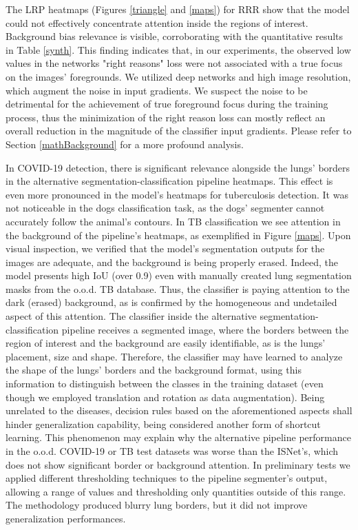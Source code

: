 \documentclass[fleqn,10pt]{wlscirep}
\begin{document}
{The LRP heatmaps (Figures \ref{triangle} and \ref{maps}) for RRR show that the model could not effectively concentrate attention inside the regions of interest. Background bias relevance is visible, corroborating with the quantitative results in Table \ref{synth}. This finding indicates that, in our experiments, the observed low values in the networks "right reasons" loss\cite{RRR} were not associated with a true focus on the images' foregrounds. We utilized deep networks and high image resolution, which augment the noise in input gradients. We suspect the noise to be detrimental for the achievement of true foreground focus during the training process, thus the minimization of the right reason loss can mostly reflect an overall reduction in the magnitude of the classifier input gradients. Please refer to Section \ref{mathBackground} for a more profound analysis.

In COVID-19 detection, there is significant relevance alongside the lungs' borders in the alternative segmentation-classification pipeline heatmaps. This effect is even more pronounced in the model's heatmaps for tuberculosis detection. It was not noticeable in the dogs classification task, as the dogs' segmenter cannot accurately follow the animal's contours. In TB classification we see attention in the background of the pipeline's heatmaps, as exemplified in Figure \ref{maps}. Upon visual inspection, we verified that the model's segmentation outputs for the images are adequate, and the background is being properly erased. Indeed, the model presents high IoU (over 0.9) even with manually created lung segmentation masks from the o.o.d. TB database. Thus, the classifier is paying attention to the dark (erased) background, as is confirmed by the homogeneous and undetailed aspect of this attention. The classifier inside the alternative segmentation-classification pipeline receives a segmented image, where the borders between the region of interest and the background are easily identifiable, as is the lungs' placement, size and shape. Therefore, the classifier may have learned to analyze the shape of the lungs' borders and the background format, using this information to distinguish between the classes in the training dataset (even though we employed translation and rotation as data augmentation). Being unrelated to the diseases, decision rules based on the aforementioned aspects shall hinder generalization capability, being considered another form of shortcut learning. This phenomenon may explain why the alternative pipeline performance in the o.o.d. COVID-19 or TB test datasets was worse than the ISNet's, which does not show significant border or background attention. In preliminary tests we applied different thresholding techniques to the pipeline segmenter's output, allowing a range of values and thresholding only quantities outside of this range. The methodology produced blurry lung borders, but it did not improve generalization performances.

}
\end{document}
